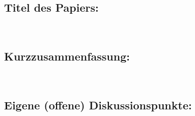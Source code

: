\documentclass[10pt,a4paper]{article}
\newcommand{\papertitle}{ } %
\begin{document}
	
\subsection*{Titel des Papiers:}

\begin{boxedminipage}[t][1cm][c]{\textwidth}
\ \\
\end{boxedminipage}
	
\subsection*{Kurzzusammenfassung:}
\begin{boxedminipage}[t][15cm][t]{\textwidth}
	
\ \\
			
\end{boxedminipage}

\subsection*{Eigene (offene) Diskussionspunkte:}	
\begin{boxedminipage}[t][12cm][t]{\textwidth}
	
\ \\

	
\end{boxedminipage}
	
\end{document}
